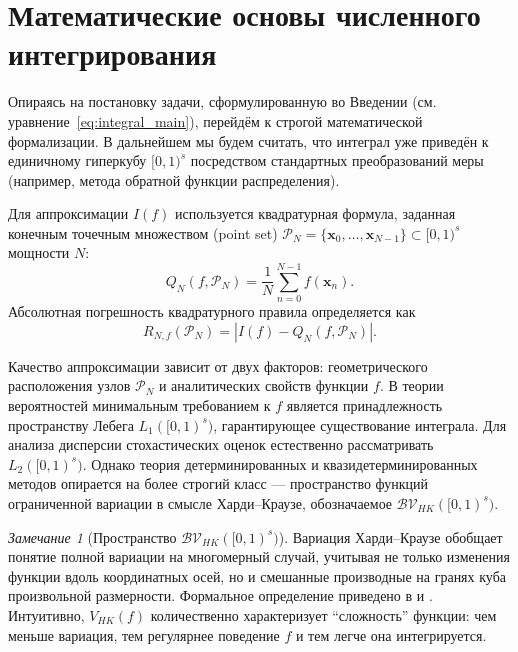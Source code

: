 \documentclass[12pt, a4paper]{article}
\theoremstyle{plain}
\theoremstyle{definition}
\theoremstyle{remark}
\newtheorem{remark}[theorem]{Замечание}
\newcommand{\II}{[0, 1)}
\newcommand{\vx}{\boldsymbol{x}}
\newcommand{\PP}{\mathcal{P}}
\newcommand{\abs}[1]{\left| #1 \right|}
\begin{document}
\section{Математические основы численного интегрирования}
\label{sec:foundations}

Опираясь на постановку задачи, сформулированную во Введении (см. уравнение~\eqref{eq:integral_main}), перейдём к строгой математической формализации. В дальнейшем мы будем считать, что интеграл уже приведён к единичному гиперкубу $\II^s$ посредством стандартных преобразований меры (например, метода обратной функции распределения).

Для аппроксимации $I(f)$ используется квадратурная формула, заданная конечным точечным множеством (point set) $\PP_N = \{\vx_0, \dots, \vx_{N-1}\} \subset \II^s$ мощности $N$:
\begin{equation}
    Q_N(f, \PP_N) = \frac{1}{N} \sum_{n=0}^{N-1} f(\vx_n).
    \label{eq:quadrature_rule}
\end{equation}
Абсолютная погрешность квадратурного правила определяется как
\begin{equation}
    R_{N,f}(\PP_N) = \abs{I(f) - Q_N(f, \PP_N)}.
    \label{eq:absolute_error}
\end{equation}

Качество аппроксимации зависит от двух факторов: геометрического расположения узлов $\PP_N$ и аналитических свойств функции $f$. В теории вероятностей минимальным требованием к $f$ является принадлежность пространству Лебега $L_1(\II^s)$, гарантирующее существование интеграла. Для анализа дисперсии стохастических оценок естественно рассматривать $L_2(\II^s)$. Однако теория детерминированных и квазидетерминированных методов опирается на более строгий класс --- пространство функций ограниченной вариации в смысле Харди--Краузе, обозначаемое $\mathcal{BV}_{HK}(\II^s)$.

\begin{remark}[Пространство $\mathcal{BV}_{HK}(\II^s)$]
    Вариация Харди--Краузе обобщает понятие полной вариации на многомерный случай, учитывая не только изменения функции вдоль координатных осей, но и смешанные производные на гранях куба произвольной размерности. Формальное определение приведено в \cite[Глава 2]{niederreiter1992random} и \cite[Приложение A]{dick2010digital}. Интуитивно, $V_{HK}(f)$ количественно характеризует ``сложность'' функции: чем меньше вариация, тем регулярнее поведение $f$ и тем легче она интегрируется.
\end{remark}
\end{document}
